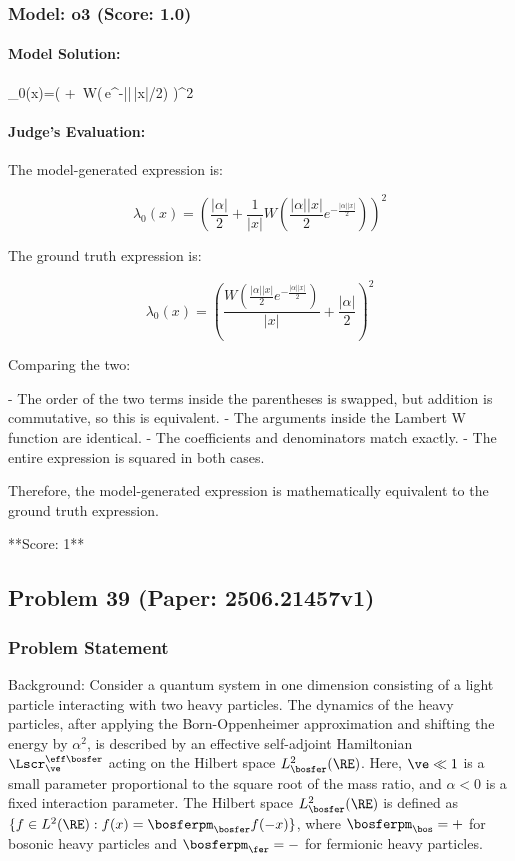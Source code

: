 \documentclass[10pt]{article}
\begin{document}
\subsubsection*{Model: o3 (Score: 1.0)}
\paragraph*{Model Solution:}
\;
\displaystyle 
\lambda_0(x)=\left(
+\,
W\!\Bigl(\,e^{-|\alpha|\,|x|/2}\Bigr)
\right)^{2}

\paragraph*{Judge's Evaluation:}

The model-generated expression is:

\[
\lambda_0(x) = \left( \frac{|\alpha|}{2} + \frac{1}{|x|} W\left(\frac{|\alpha||x|}{2} e^{-\frac{|\alpha||x|}{2}}\right) \right)^2
\]

The ground truth expression is:

\[
\lambda_0(x) = \left( \frac{W\left(\frac{|\alpha||x|}{2} e^{-\frac{|\alpha||x|}{2}}\right)}{|x|} + \frac{|\alpha|}{2} \right)^2
\]

Comparing the two:

- The order of the two terms inside the parentheses is swapped, but addition is commutative, so this is equivalent.
- The arguments inside the Lambert W function are identical.
- The coefficients and denominators match exactly.
- The entire expression is squared in both cases.

Therefore, the model-generated expression is mathematically equivalent to the ground truth expression.

**Score: 1**

\newpage
\subsection*{Problem 39 (Paper: 2506.21457v1)}
\subsubsection*{Problem Statement}
Background:
Consider a quantum system in one dimension consisting of a light particle interacting with two heavy particles. The dynamics of the heavy particles, after applying the Born-Oppenheimer approximation and shifting the energy by $\alpha^2$, is described by an effective self-adjoint Hamiltonian $\Lscr^{\eff\bosfer}_\ve$ acting on the Hilbert space $L^2_{\bosfer}(\RE)$. Here, $\ve \ll 1$ is a small parameter proportional to the square root of the mass ratio, and $\alpha < 0$ is a fixed interaction parameter. The Hilbert space $L^2_{\bosfer}(\RE)$ is defined as $\{f\in L^2(\RE): f(x)=\bosferpm_{\bosfer} f(-x)\}$, where $\bosferpm_{\bos} = +$ for bosonic heavy particles and $\bosferpm_{\fer} = -$ for fermionic heavy particles.
\end{document}
